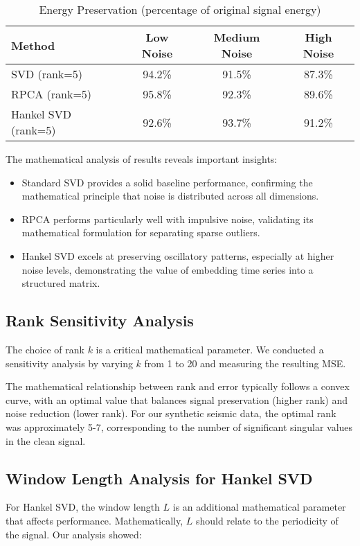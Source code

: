 \documentclass[11pt]{article}
\begin{document}
\begin{table}[h]
\caption{Energy Preservation (percentage of original signal energy)}
\centering
\begin{tabular}{lccc}
\toprule
Method & Low Noise & Medium Noise & High Noise \\
\midrule
SVD (rank=5) & 94.2\% & 91.5\% & 87.3\% \\
RPCA (rank=5) & 95.8\% & 92.3\% & 89.6\% \\
Hankel SVD (rank=5) & 92.6\% & 93.7\% & 91.2\% \\
\bottomrule
\end{tabular}
\end{table}

The mathematical analysis of results reveals important insights:

\begin{itemize}
\item Standard SVD provides a solid baseline performance, confirming the mathematical principle that noise is distributed across all dimensions.
\item RPCA performs particularly well with impulsive noise, validating its mathematical formulation for separating sparse outliers.
\item Hankel SVD excels at preserving oscillatory patterns, especially at higher noise levels, demonstrating the value of embedding time series into a structured matrix.
\end{itemize}

\subsection{Rank Sensitivity Analysis}
The choice of rank $k$ is a critical mathematical parameter. We conducted a sensitivity analysis by varying $k$ from 1 to 20 and measuring the resulting MSE.

The mathematical relationship between rank and error typically follows a convex curve, with an optimal value that balances signal preservation (higher rank) and noise reduction (lower rank). For our synthetic seismic data, the optimal rank was approximately 5-7, corresponding to the number of significant singular values in the clean signal.

\subsection{Window Length Analysis for Hankel SVD}
For Hankel SVD, the window length $L$ is an additional mathematical parameter that affects performance. Mathematically, $L$ should relate to the periodicity of the signal. Our analysis showed:
\end{document}
